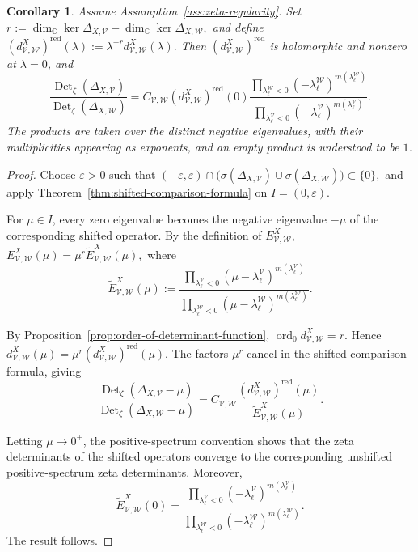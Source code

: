\documentclass[12pt]{amsart}
\theoremstyle{plain}
\newtheorem{cor}[thm]{Corollary}
\theoremstyle{definition}
\theoremstyle{remark}
\numberwithin{equation}{section} \numberwithin{figure}{section}
\renewcommand*{\to}{\rightarrow}
\newcommand{\mb}[1]{\mathbb{#1}} %
\begin{document}
\begin{cor}\label{cor:zeta-determinant-comparison-zero}
Assume Assumption~\ref{ass:zeta-regularity}. Set
\(
r:=
\dim_{\mb C}\ker\Delta_{X,\mathcal V}
-
\dim_{\mb C}\ker\Delta_{X,\mathcal W},
\)
and define
\(
(d_{\mathcal V,\mathcal W}^{X})^{\mathrm{red}}(\lambda)
:=
\lambda^{-r}d_{\mathcal V,\mathcal W}^{X}(\lambda).
\)
Then
\((d_{\mathcal V,\mathcal W}^{X})^{\mathrm{red}}\) is holomorphic
and nonzero at \(\lambda=0\), and
\[
\frac{
\operatorname{Det}_{\zeta}(\Delta_{X,\mathcal V})
}{
\operatorname{Det}_{\zeta}(\Delta_{X,\mathcal W})
}
=
C_{\mathcal V,\mathcal W}
(d_{\mathcal V,\mathcal W}^{X})^{\mathrm{red}}(0)
\frac{
\displaystyle
\prod_{\lambda_\ell^{\mathcal W}<0}
(-\lambda_\ell^{\mathcal W})
^{m(\lambda_\ell^{\mathcal W})}
}{
\displaystyle
\prod_{\lambda_\ell^{\mathcal V}<0}
(-\lambda_\ell^{\mathcal V})
^{m(\lambda_\ell^{\mathcal V})}
}.
\]
The products are taken over the distinct negative eigenvalues, with
their multiplicities appearing as exponents, and an empty product
is understood to be \(1\).
\end{cor}

\begin{proof}
Choose \(\varepsilon>0\) such that
\(
(-\varepsilon,\varepsilon)\cap
\bigl(
\sigma(\Delta_{X,\mathcal V})
\cup\sigma(\Delta_{X,\mathcal W})
\bigr)
\subset\{0\},
\)
and apply Theorem~\ref{thm:shifted-comparison-formula} on
\(I=(0,\varepsilon)\).

For \(\mu\in I\), every zero eigenvalue becomes the negative
eigenvalue \(-\mu\) of the corresponding shifted operator. By the
definition of \(E_{\mathcal V,\mathcal W}^{X}\),
\(
E_{\mathcal V,\mathcal W}^{X}(\mu)
=
\mu^r\widetilde E_{\mathcal V,\mathcal W}^{X}(\mu),
\)
where
\[
\widetilde E_{\mathcal V,\mathcal W}^{X}(\mu)
:=
\frac{
\displaystyle
\prod_{\lambda_\ell^{\mathcal V}<0}
(\mu-\lambda_\ell^{\mathcal V})
^{m(\lambda_\ell^{\mathcal V})}
}{
\displaystyle
\prod_{\lambda_\ell^{\mathcal W}<0}
(\mu-\lambda_\ell^{\mathcal W})
^{m(\lambda_\ell^{\mathcal W})}
}.
\]

By Proposition~\ref{prop:order-of-determinant-function},
\(
\operatorname{ord}_0
d_{\mathcal V,\mathcal W}^{X}
=
r.
\)
Hence
\(
d_{\mathcal V,\mathcal W}^{X}(\mu)
=
\mu^r
(d_{\mathcal V,\mathcal W}^{X})^{\mathrm{red}}(\mu).
\)
The factors \(\mu^r\) cancel in the shifted comparison formula,
giving
\[
\frac{
\operatorname{Det}_{\zeta}(\Delta_{X,\mathcal V}-\mu)
}{
\operatorname{Det}_{\zeta}(\Delta_{X,\mathcal W}-\mu)
}
=
C_{\mathcal V,\mathcal W}
\frac{
(d_{\mathcal V,\mathcal W}^{X})^{\mathrm{red}}(\mu)
}{
\widetilde E_{\mathcal V,\mathcal W}^{X}(\mu)
}.
\]

Letting \(\mu\to0^+\), the positive-spectrum convention shows that
the zeta determinants of the shifted operators converge to the
corresponding unshifted positive-spectrum zeta determinants. Moreover,
\[
\widetilde E_{\mathcal V,\mathcal W}^{X}(0)
=
\frac{
\displaystyle
\prod_{\lambda_\ell^{\mathcal V}<0}
(-\lambda_\ell^{\mathcal V})
^{m(\lambda_\ell^{\mathcal V})}
}{
\displaystyle
\prod_{\lambda_\ell^{\mathcal W}<0}
(-\lambda_\ell^{\mathcal W})
^{m(\lambda_\ell^{\mathcal W})}
}.
\]
The result follows.
\end{proof}
\end{document}
